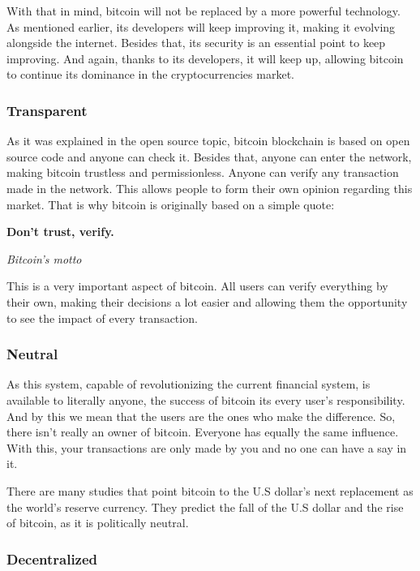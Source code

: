 \documentclass{article}
\newcommand\tab[1][1cm]{\hspace*{#1}}
\begin{document}
With that in mind, bitcoin will not be replaced by a more powerful technology. As mentioned earlier, its developers will keep improving it, making it evolving alongside the internet. Besides that, its security is an essential point to keep improving. And again, thanks to its developers, it will keep up, allowing bitcoin to continue its dominance in the cryptocurrencies market.

\subsubsection{Transparent}

\tab As it was explained in the open source topic, bitcoin blockchain is based on open source code and anyone can check it. Besides that, anyone can enter the network, making bitcoin trustless and permissionless. Anyone can verify any transaction made in the network. This allows people to form their own opinion regarding this market. That is why bitcoin is originally based on a simple quote:

\renewcommand{\epigraphflush}{center}
\epigraph{\textbf{Don't trust, verify.}}{\textit{Bitcoin's motto}}

This is a very important aspect of bitcoin. All users can verify everything by their own, making their decisions a lot easier and allowing them the opportunity to see the impact of every transaction.


\subsubsection{Neutral}

\tab As this system, capable of revolutionizing the current financial system, is available to literally anyone, the success of bitcoin its every user's responsibility. And by this we mean that the users are the ones who make the difference. So, there isn't really an owner of bitcoin. Everyone has equally the same influence. With this, your transactions are only made by you and no one can have a say in it. 

There are many studies that point bitcoin to the U.S dollar's next replacement as the world's reserve currency. They predict the fall of the U.S dollar and the rise of bitcoin, as it is politically neutral. 

\subsubsection{Decentralized}
\end{document}
